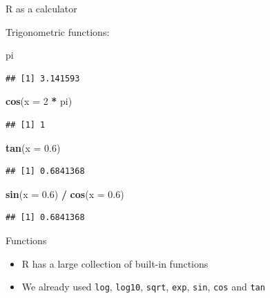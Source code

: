 \documentclass[ignorenonframetext,]{beamer}
\newenvironment{Shaded}{\begin{snugshade}}{\end{snugshade}}
\newcommand{\DataTypeTok}[1]{\textcolor[rgb]{0.13,0.29,0.53}{#1}}
\newcommand{\DecValTok}[1]{\textcolor[rgb]{0.00,0.00,0.81}{#1}}
\newcommand{\FloatTok}[1]{\textcolor[rgb]{0.00,0.00,0.81}{#1}}
\newcommand{\KeywordTok}[1]{\textcolor[rgb]{0.13,0.29,0.53}{\textbf{#1}}}
\newcommand{\NormalTok}[1]{#1}
\newcommand{\OperatorTok}[1]{\textcolor[rgb]{0.81,0.36,0.00}{\textbf{#1}}}
\newcommand{\StringTok}[1]{\textcolor[rgb]{0.31,0.60,0.02}{#1}}
\begin{document}
\begin{frame}[fragile]{R as a calculator}
\protect\hypertarget{r-as-a-calculator-5}{}

Trigonometric functions:

\begin{Shaded}
\begin{Highlighting}[]
\NormalTok{pi}
\end{Highlighting}
\end{Shaded}

\begin{verbatim}
## [1] 3.141593
\end{verbatim}

\begin{Shaded}
\begin{Highlighting}[]
\KeywordTok{cos}\NormalTok{(}\DataTypeTok{x =} \DecValTok{2} \OperatorTok{*}\StringTok{ }\NormalTok{pi)}
\end{Highlighting}
\end{Shaded}

\begin{verbatim}
## [1] 1
\end{verbatim}

\begin{Shaded}
\begin{Highlighting}[]
\KeywordTok{tan}\NormalTok{(}\DataTypeTok{x =} \FloatTok{0.6}\NormalTok{)}
\end{Highlighting}
\end{Shaded}

\begin{verbatim}
## [1] 0.6841368
\end{verbatim}

\begin{Shaded}
\begin{Highlighting}[]
\KeywordTok{sin}\NormalTok{(}\DataTypeTok{x =} \FloatTok{0.6}\NormalTok{) }\OperatorTok{/}\StringTok{ }\KeywordTok{cos}\NormalTok{(}\DataTypeTok{x =} \FloatTok{0.6}\NormalTok{)}
\end{Highlighting}
\end{Shaded}

\begin{verbatim}
## [1] 0.6841368
\end{verbatim}

\end{frame}

\begin{frame}[fragile]{Functions}
\protect\hypertarget{functions}{}

\begin{itemize}
\item
  R has a large collection of built-in functions
\item
  We already used \texttt{log}, \texttt{log10}, \texttt{sqrt},
  \texttt{exp}, \texttt{sin}, \texttt{cos} and \texttt{tan}
\end{itemize}

\end{frame}
\end{document}
